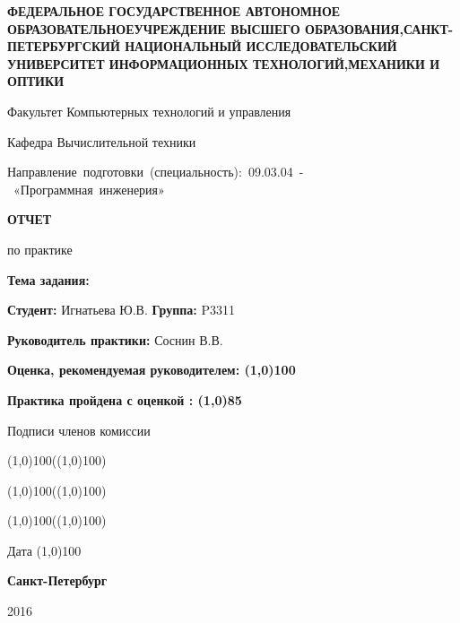 \begin{titlepage}

\begin{center}   
{\bfseries  
ФЕДЕРАЛЬНОЕ ГОСУДАРСТВЕННОЕ АВТОНОМНОЕ ОБРАЗОВАТЕЛЬНОЕУЧРЕЖДЕНИЕ ВЫСШЕГО ОБРАЗОВАНИЯ,САНКТ-ПЕТЕРБУРГСКИЙ НАЦИОНАЛЬНЫЙ ИССЛЕДОВАТЕЛЬСКИЙ УНИВЕРСИТЕТ ИНФОРМАЦИОННЫХ ТЕХНОЛОГИЙ,МЕХАНИКИ И ОПТИКИ
\par\smallskip
Факультет Компьютерных технологий и управления
\par\smallskip
Кафедра Вычислительной техники\\
}
\par\smallskip
\mbox{Направление подготовки (специальность): 09.03.04 - «Программная инженерия»}

\vspace{3cm} 
{\bfseries
ОТЧЕТ 
\par\medskip
по практике
}
\end{center}  

\par\noindent \smallskip
{\bfseries Тема задания:}
\par\noindent \smallskip
{\bfseries Студент: } Игнатьева Ю.В. {\bfseries Группа: } P3311
\par\noindent \smallskip
{\bfseries Руководитель практики: } Соснин В.В.
\par\noindent \smallskip
{\bfseries Оценка, рекомендуемая руководителем: \line(1,0){100} }
\vspace{1cm}

\parindent=8cm
{\bfseries Практика пройдена с оценкой : \line(1,0){85} \par \bigskip
Подписи членов комиссии \par \bigskip

\begin{flushright}  
\line(1,0){100}(\line(1,0){100}) \par \bigskip
\line(1,0){100}(\line(1,0){100}) \par \bigskip
\line(1,0){100}(\line(1,0){100}) \par \bigskip
\end{flushright} 

\parindent=8cm
Дата \line(1,0){100} }
\vspace{\fill}
\begin{center}  
\bfseries Санкт-Петербург \par 2016
\end{center} 

\end{titlepage}